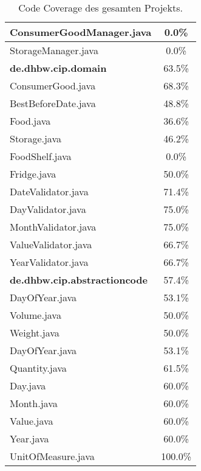 \begin{table}[ht]
\begin{tabular}{|l|c|}
        \hline
        ConsumerGoodManager.java & 0.0\% \\
        \hline
        StorageManager.java & 0.0\% \\
        \hline
        \textbf{de.dhbw.cip.domain} & 63.5\% \\
        \hline
        ConsumerGood.java & 68.3\% \\
        \hline
        BestBeforeDate.java & 48.8\% \\
        \hline
        Food.java & 36.6\% \\
        \hline
        Storage.java & 46.2\% \\
        \hline
        FoodShelf.java & 0.0\% \\
        \hline
        Fridge.java & 50.0\% \\
        \hline
        DateValidator.java & 71.4\% \\
        \hline
        DayValidator.java & 75.0\% \\
        \hline
        MonthValidator.java & 75.0\% \\
        \hline
        ValueValidator.java & 66.7\% \\
        \hline
        YearValidator.java & 66.7\% \\
        \hline
        \textbf{de.dhbw.cip.abstractioncode} & 57.4\% \\
        \hline
        DayOfYear.java & 53.1\% \\
        \hline
        Volume.java & 50.0\% \\
        \hline
        Weight.java & 50.0\% \\
        \hline
        DayOfYear.java & 53.1\% \\
        \hline
        Quantity.java & 61.5\% \\
        \hline
        Day.java & 60.0\% \\
        \hline
        Month.java & 60.0\% \\
        \hline
        Value.java & 60.0\% \\
        \hline
        Year.java & 60.0\% \\
        \hline
        UnitOfMeasure.java & 100.0\% \\
        \hline
    \end{tabular}
    \caption{Code Coverage des gesamten Projekts.}
    \label{tab:code-coverage-full}
\end{table}
